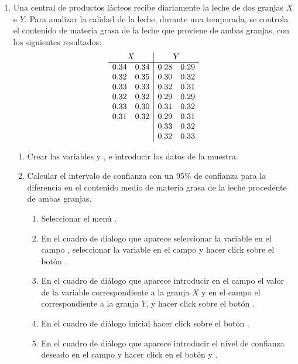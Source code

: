 \begin{enumerate}[leftmargin=*]
\item  Una central de productos lácteos recibe diariamente la leche de dos granjas $X$ e $Y$. Para analizar la calidad de
la leche, durante una temporada, se controla el contenido de materia grasa de la leche que proviene de ambas granjas, con
los siguientes resultados:
\[
\begin{array}{ll|ll}
\multicolumn{2}{c|}{X} & \multicolumn{2}{c}{Y} \\
\hline
0.34 & 0.34 & 0.28 & 0.29 \\
0.32 & 0.35 & 0.30 & 0.32 \\
0.33 & 0.33 & 0.32 & 0.31 \\
0.32 & 0.32 & 0.29 & 0.29 \\
0.33 & 0.30 & 0.31 & 0.32 \\
0.31 & 0.32 & 0.29 & 0.31 \\
 &  & 0.33 & 0.32 \\
 &  & 0.32 & 0.33 \\
\end{array}
\]

\begin{enumerate}
\item Crear las variables  y , e introducir los datos de la muestra.

\item Calcular el intervalo de confianza con un 95\% de confianza para la diferencia en el contenido medio de materia
grasa de la leche procedente de ambas granjas. 
\begin{indicacion}
\begin{enumerate}
\item Seleccionar el menú .
\item En el cuadro de dialogo que aparece seleccionar la variable  
en el campo , seleccionar la 
variable  en el campo  y hacer click sobre el
botón .
\item En el cuadro de diálogo que aparece introducir en el campo  el valor de la variable
 correspondiente a la granja $X$ y en el campo  el correspondiente a la granja $Y$, y
hacer click sobre el botón .
\item En el cuadro de diálogo inicial hacer click sobre el botón .
\item En el cuadro de diálogo que aparece introducir el nivel de 
confianza deseado en el campo  y hacer click en el botón  y .
\end{enumerate}
\end{indicacion}


\end{enumerate}
\end{enumerate}
